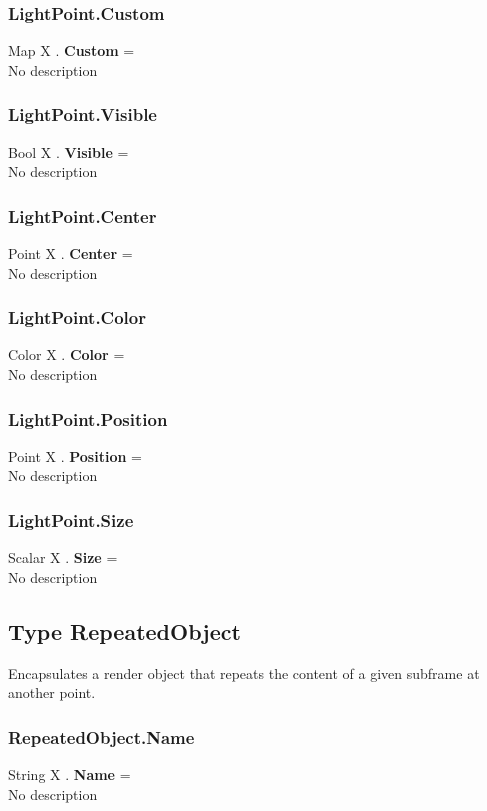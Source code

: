\subsubsection{LightPoint.Custom \label{F:LightPoint:Custom}}
Map X . \textbf{Custom} = \\
No description

\subsubsection{LightPoint.Visible \label{F:LightPoint:Visible}}
Bool X . \textbf{Visible} = \\
No description

\subsubsection{LightPoint.Center \label{F:LightPoint:Center}}
Point X . \textbf{Center} = \\
No description

\subsubsection{LightPoint.Color \label{F:LightPoint:Color}}
Color X . \textbf{Color} = \\
No description

\subsubsection{LightPoint.Position \label{F:LightPoint:Position}}
Point X . \textbf{Position} = \\
No description

\subsubsection{LightPoint.Size \label{F:LightPoint:Size}}
Scalar X . \textbf{Size} = \\
No description

\subsection{Type RepeatedObject \label{T:RepeatedObject}}
Encapsulates a render object that repeats the content of a given subframe at another point.

\subsubsection{RepeatedObject.Name \label{F:RepeatedObject:Name}}
String X . \textbf{Name} = \\
No description

